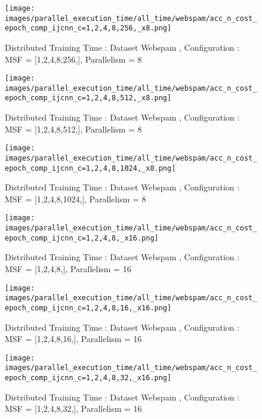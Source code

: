 \begin{figure*}[htbp]
\centering
\texttt{[image: images/parallel\_execution\_time/all\_time/webspam/acc\_n\_cost\_epoch\_comp\_ijcnn\_c=1,2,4,8,256,\_x8.png]}
\caption{Distributed Training Time : Dataset Webspam , Configuration : MSF = [1,2,4,8,256,], Parallelism = 8}
\label{fig:dis-msf-tr-time-webspam-x8}
\end{figure*}


\begin{figure*}[htbp]
\centering
\texttt{[image: images/parallel\_execution\_time/all\_time/webspam/acc\_n\_cost\_epoch\_comp\_ijcnn\_c=1,2,4,8,512,\_x8.png]}
\caption{Distributed Training Time : Dataset Webspam , Configuration : MSF = [1,2,4,8,512,], Parallelism = 8}
\label{fig:dis-msf-tr-time-webspam-x8}
\end{figure*}


\begin{figure*}[htbp]
\centering
\texttt{[image: images/parallel\_execution\_time/all\_time/webspam/acc\_n\_cost\_epoch\_comp\_ijcnn\_c=1,2,4,8,1024,\_x8.png]}
\caption{Distributed Training Time : Dataset Webspam , Configuration : MSF = [1,2,4,8,1024,], Parallelism = 8}
\label{fig:dis-msf-tr-time-webspam-x8}
\end{figure*}


\begin{figure*}[htbp]
\centering
\texttt{[image: images/parallel\_execution\_time/all\_time/webspam/acc\_n\_cost\_epoch\_comp\_ijcnn\_c=1,2,4,8,\_x16.png]}
\caption{Distributed Training Time : Dataset Webspam , Configuration : MSF = [1,2,4,8,], Parallelism = 16}
\label{fig:dis-msf-tr-time-webspam-x16}
\end{figure*}


\begin{figure*}[htbp]
\centering
\texttt{[image: images/parallel\_execution\_time/all\_time/webspam/acc\_n\_cost\_epoch\_comp\_ijcnn\_c=1,2,4,8,16,\_x16.png]}
\caption{Distributed Training Time : Dataset Webspam , Configuration : MSF = [1,2,4,8,16,], Parallelism = 16}
\label{fig:dis-msf-tr-time-webspam-x16}
\end{figure*}


\begin{figure*}[htbp]
\centering
\texttt{[image: images/parallel\_execution\_time/all\_time/webspam/acc\_n\_cost\_epoch\_comp\_ijcnn\_c=1,2,4,8,32,\_x16.png]}
\caption{Distributed Training Time : Dataset Webspam , Configuration : MSF = [1,2,4,8,32,], Parallelism = 16}
\label{fig:dis-msf-tr-time-webspam-x16}
\end{figure*}


